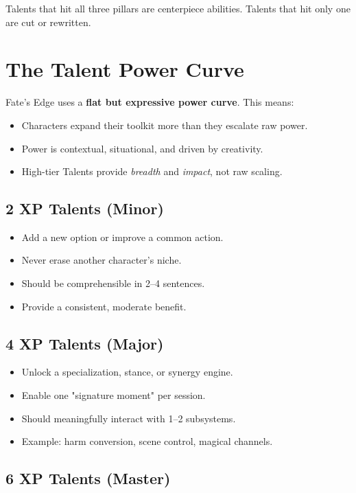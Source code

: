 \documentclass[11pt]{book}
\begin{document}
Talents that hit all three pillars are centerpiece abilities.
Talents that hit only one are cut or rewritten.

\section{The Talent Power Curve}

Fate's Edge uses a \textbf{flat but expressive power curve}.
This means:
\begin{itemize}
    \item Characters expand their toolkit more than they escalate raw power.
    \item Power is contextual, situational, and driven by creativity.
    \item High-tier Talents provide \emph{breadth} and \emph{impact}, not raw scaling.
\end{itemize}

\subsection{2 XP Talents (Minor)}

\begin{itemize}
    \item Add a new option or improve a common action.
    \item Never erase another character's niche.
    \item Should be comprehensible in 2--4 sentences.
    \item Provide a consistent, moderate benefit.
\end{itemize}

\subsection{4 XP Talents (Major)}

\begin{itemize}
    \item Unlock a specialization, stance, or synergy engine.
    \item Enable one "signature moment" per session.
    \item Should meaningfully interact with 1--2 subsystems.
    \item Example: harm conversion, scene control, magical channels.
\end{itemize}

\subsection{6 XP Talents (Master)}
\end{document}
